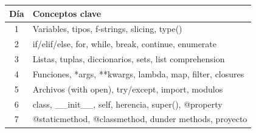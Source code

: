 \documentclass[10pt,a4paper]{article}
\begin{document}
\begin{center}
\small
\begin{tabular}{cl}
\toprule
\textbf{D\'ia} & \textbf{Conceptos clave} \\
\midrule
1 & Variables, tipos, f-strings, slicing, type() \\
2 & if/elif/else, for, while, break, continue, enumerate \\
3 & Listas, tuplas, diccionarios, sets, list comprehension \\
4 & Funciones, *args, **kwargs, lambda, map, filter, closures \\
5 & Archivos (with open), try/except, import, modulos \\
6 & class, \_\_init\_\_, self, herencia, super(), @property \\
7 & @staticmethod, @classmethod, dunder methods, proyecto \\
\bottomrule
\end{tabular}
\end{center}
\end{document}
